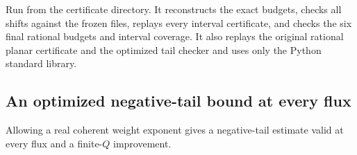 \documentclass[11pt]{article}
\begin{document}
Run  from the certificate
directory. It reconstructs the exact budgets, checks all shifts
against the frozen files, replays every interval certificate,
and checks the six final rational budgets and interval coverage.
It also replays the original rational planar certificate and the optimized
tail checker and uses only the Python standard library.

\subsection{An optimized negative-tail bound at every flux}
\label{app:optimized-tail}

Allowing a real coherent weight exponent gives a negative-tail estimate
valid at every flux and a finite-$Q$ improvement.
\end{document}
